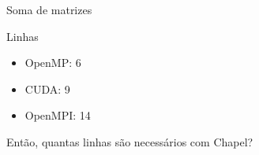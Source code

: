\begin{frame}{Soma de matrizes}
	\begin{block}{Linhas}
		\begin{itemize}
			\item OpenMP: 6
			\item CUDA: 9
			\item OpenMPI: 14
		\end{itemize}
	\end{block}
	\centering
	Então, quantas linhas são necessários com Chapel?
\end{frame}
